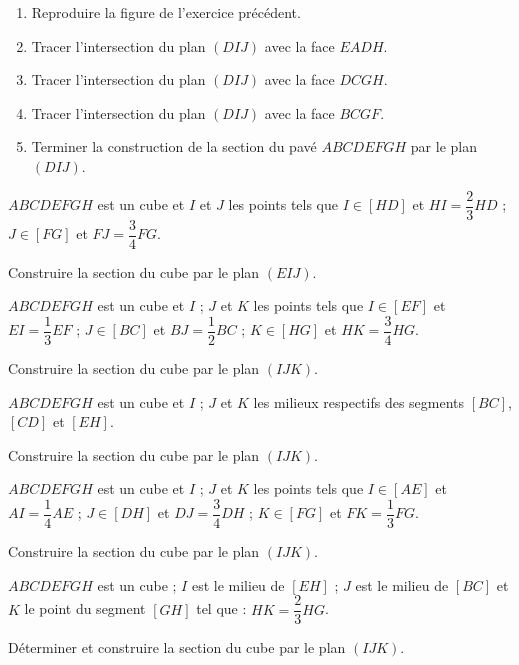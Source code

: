 \documentclass{cornouaille}
\begin{document}
\begin{exercice}
  \begin{enumerate}
  \item Reproduire la figure de l'exercice précédent.
  \item Tracer l'intersection du plan $(DIJ)$ avec la face $EADH$.
  \item Tracer l'intersection du plan $(DIJ)$ avec la face $DCGH$.
  \item Tracer l'intersection du plan $(DIJ)$ avec la face $BCGF$.
  \item Terminer la construction de la section du pavé $ABCDEFGH$ par
    le plan $(DIJ)$.
  \end{enumerate}
\end{exercice}

\begin{exercice}
  $ABCDEFGH$ est un cube et $I$ et $J$ les points tels que $I\in [HD]$
  et $HI=\dfrac{2}{3}HD$ ; $J\in [FG]$ et $FJ=\dfrac{3}{4}FG$.

  Construire la section du cube par le plan $(EIJ)$.
\end{exercice}

\begin{exercice}
  $ABCDEFGH$ est un cube et $I$ ; $J$ et $K$ les points tels que
  $I\in [EF]$ et $EI=\dfrac{1}{3}EF$ ; $J\in [BC]$ et
  $BJ=\dfrac{1}{2}BC$ ; $K\in [HG]$ et $HK=\dfrac{3}{4}HG$.

  Construire la section du cube par le plan $(IJK)$.
\end{exercice}

\begin{exercice}
  $ABCDEFGH$ est un cube et $I$ ; $J$ et $K$ les milieux respectifs
  des segments $[BC]$, $[CD]$ et $[EH]$.

  Construire la section du cube par le plan $(IJK)$.
\end{exercice}

\begin{exercice}
  $ABCDEFGH$ est un cube et $I$ ; $J$ et $K$ les points tels que
  $I\in [AE]$ et $AI=\dfrac{1}{4}AE$ ; $J\in [DH]$ et
  $DJ=\dfrac{3}{4}DH$ ; $K\in [FG]$ et $FK=\dfrac{1}{3}FG$.

  Construire la section du cube par le plan $(IJK)$.
\end{exercice}



\begin{exercice}
  $ABCDEFGH$ est un cube ; $I$ est le milieu de $[EH]$ ; $J$ est le
  milieu de $[BC]$ et $K$ le point du segment $[GH]$ tel que :
  $HK=\dfrac{2}{3}HG$.

  Déterminer et construire la section du cube par le plan $(IJK)$.
\end{exercice}
\end{document}

